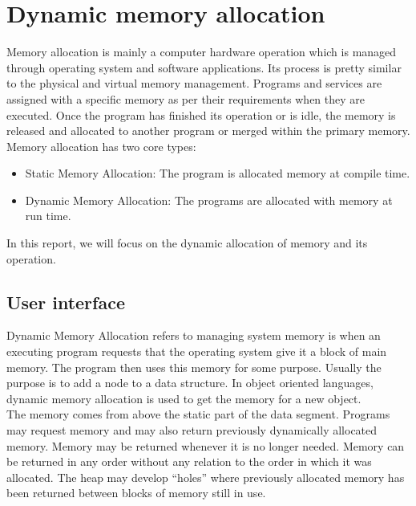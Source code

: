 \section{Dynamic memory allocation}

Memory allocation is mainly a computer hardware operation which is managed through operating system and software applications. Its process is pretty similar to the physical and virtual memory management. Programs and services are assigned with a specific memory as per their requirements when they are executed. Once the program has finished its operation or is idle, the memory is released and allocated to another program or merged within the primary memory.\\

Memory allocation has two core types:
\begin{itemize}
\item Static Memory Allocation: The program is allocated memory at compile time.
\end{itemize}

\begin{itemize}
\item Dynamic Memory Allocation: The programs are allocated with memory at run time.
\end{itemize}

In this report, we will focus on the dynamic allocation of memory and its operation.

\subsection{User interface}

Dynamic Memory Allocation refers to managing system memory is when an executing program requests that the operating system give it a block of main memory. The program then uses this memory for some purpose. Usually the purpose is to add a node to a data structure. In object oriented languages, dynamic memory allocation is used to get the memory for a new object.\\

The memory comes from above the static part of the data segment. Programs may request memory and may also return previously dynamically allocated memory. Memory may be returned whenever it is no longer needed. Memory can be returned in any order without any relation to the order in which it was allocated. The heap may develop ``holes'' where previously allocated memory has been returned between blocks of memory still in use.\\

